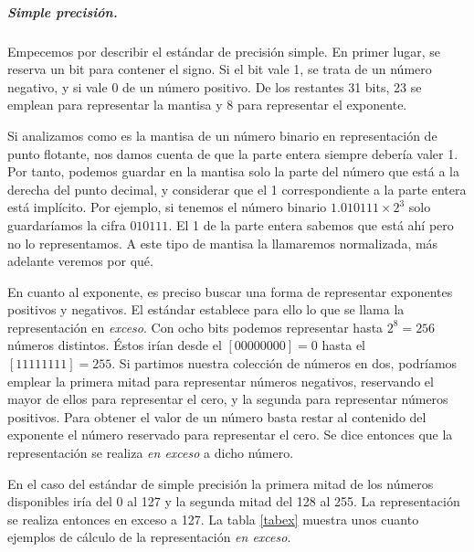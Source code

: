 \begin{paracol}{2}
\subparagraph*{Simple precisión.} Empecemos por describir el estándar de precisión simple. En primer lugar, se reserva un bit para contener el signo. Si el bit vale 1, se trata de un número negativo, y si vale 0 de un número positivo. De los restantes 31 bits, 23 se emplean para representar la mantisa y 8 para representar el exponente.

Si analizamos como es la mantisa de un número binario en representación de punto flotante, nos damos cuenta de que la parte entera siempre debería valer 1. Por tanto, podemos guardar en la mantisa solo la parte del número que está a la derecha del punto decimal, y considerar que el  1 correspondiente a la parte entera está implícito. Por ejemplo, si tenemos el número binario $1.010111\times 2^{3}$ solo guardaríamos la cifra $010111$. El 1 de la parte entera sabemos que está ahí pero no lo representamos. A este tipo de mantisa la llamaremos normalizada, más adelante veremos por qué.

 En cuanto al exponente, es preciso buscar una forma de representar exponentes positivos y negativos. El estándar establece para ello lo que se llama la representación en \emph{exceso}. Con ocho bits podemos representar hasta $2^8=256$ números distintos. Éstos irían desde el $[00000000]=0$ hasta el $[11111111]=255$. Si partimos nuestra colección de números en dos, podríamos emplear la primera mitad para representar números negativos, reservando el mayor de ellos para representar el cero, y la segunda para representar números positivos. Para obtener el valor de un número basta restar al contenido del exponente el número reservado para representar el cero. Se dice entonces que la representación se realiza \emph{en exceso} a dicho número.

En el caso del estándar de simple precisión la primera mitad de los números disponibles iría del 0 al 127 y la segunda mitad del 128 al 255. La representación se realiza entonces en exceso a 127. La tabla \ref{tabex} muestra unos cuanto ejemplos de cálculo de la representación \emph{en exceso}.
\end{paracol}


